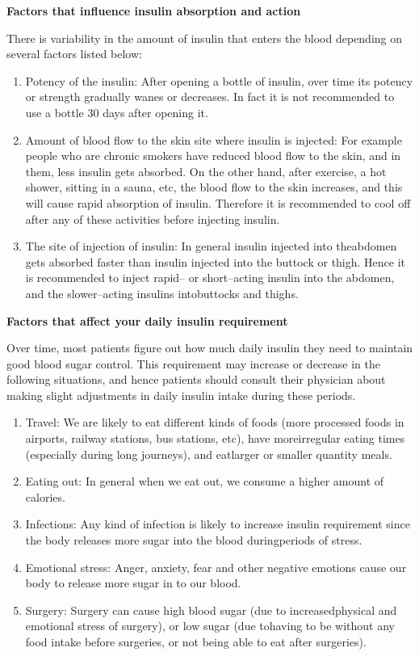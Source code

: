 \noindent\textbf{Factors that influence insulin absorption and action}

There is variability in the amount of insulin that enters the blood depending on several factors listed below:

\begin{enumerate}[•]
\itemsep=0pt
\item Potency of the insulin: After opening a bottle of insulin, over time its potency or strength gradually wanes or decreases. In fact it is not recommended to use a bottle 30 days after opening it.
\item Amount of blood flow to the skin site where insulin is injected: For example people who are chronic smokers have reduced blood flow to the skin, and in them, less insulin gets absorbed. On the other hand, after exercise, a hot shower, sitting in a sauna, etc, the blood flow to the skin increases, and this will cause rapid absorption of insulin. Therefore it is recommended to cool off after any of these activities before injecting insulin.
\item The site of injection of insulin: In general insulin injected into the\break abdomen gets absorbed faster than insulin injected into the buttock or thigh. Hence it is recommended to inject rapid– or short–acting insulin into the abdomen, and the slower–acting insulins into\break buttocks and thighs.
\end{enumerate}

\noindent\textbf{Factors that affect your daily insulin requirement}

Over time, most patients figure out how much daily insulin they need to maintain good blood sugar control. This requirement may increase or decrease in the following situations, and hence patients should consult their physician about making slight adjustments in daily insulin intake during these periods.

\begin{enumerate}[•]
\itemsep=0pt
\item Travel: We are likely to eat different kinds of foods (more processed foods in airports, railway stations, bus stations, etc), have more\break irregular eating times (especially during long journeys), and eat\break larger or smaller quantity meals.
\item Eating out: In general when we eat out, we consume a higher amount of calories.
\item Infections: Any kind of infection is likely to increase insulin requirement since the body releases more sugar into the blood during\break periods of stress.
\item Emotional stress: Anger, anxiety, fear and other negative emotions cause our body to release more sugar in to our blood.
\item Surgery: Surgery can cause high blood sugar (due to increased\break physical and emotional stress of surgery), or low sugar (due to\break having to be without any food intake before surgeries, or not being able to eat after surgeries).
\end{enumerate}

